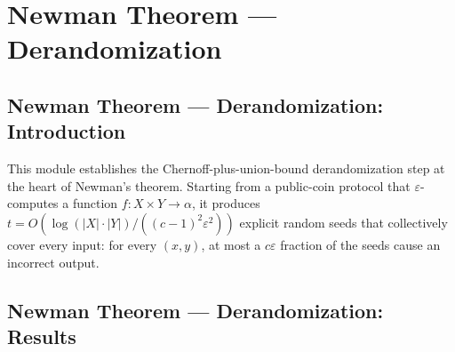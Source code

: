 \section{Newman Theorem --- Derandomization}
\subsection*{Newman Theorem --- Derandomization: Introduction}

This module establishes the Chernoff-plus-union-bound derandomization step at the heart
of Newman's theorem.  Starting from a public-coin protocol that $\varepsilon$-computes a
function $f : X \times Y \to \alpha$, it produces
$t = O\!\left(\log(|X|\cdot|Y|)/((c-1)^2\varepsilon^2)\right)$ explicit random seeds
that collectively cover every input: for every $(x,y)$, at most a $c\varepsilon$ fraction
of the seeds cause an incorrect output.

\subsection*{Newman Theorem --- Derandomization: Results}


